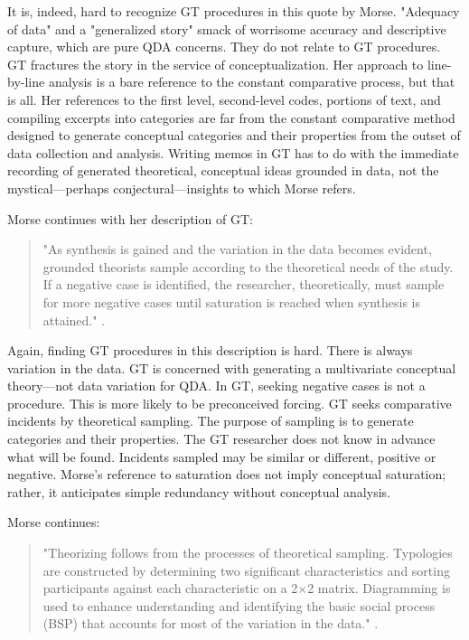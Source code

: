 It is, indeed, hard to recognize GT procedures in this quote by Morse.
"Adequacy of data" and a "generalized story" smack of worrisome accuracy and descriptive capture, 
which are pure QDA concerns. 
They do not relate to GT procedures. 
GT fractures the story in the service of conceptualization. 
Her approach to line-by-line analysis is a bare reference to the constant comparative process, but that is all. 
Her references to the first level, second-level codes, portions of text, and compiling excerpts into categories are far from the constant comparative method designed to generate conceptual categories and their properties from the outset of data collection and analysis.
Writing memos in GT has to do with the immediate recording of generated theoretical, conceptual ideas grounded in data, not the mystical—perhaps conjectural—insights to which Morse refers.

Morse continues with her description of GT:
\begin{quote}
"As synthesis is gained and the variation in the data becomes evident,
grounded theorists sample according to the theoretical needs of the
study. 
If a negative case is identified, the researcher, theoretically, must
sample for more negative cases until saturation is reached when
synthesis is attained."
\citep[p. 39]{incollection.morse94}.
\end{quote}

Again, finding GT procedures in this description is hard. 
There is always variation in the data. 
GT is concerned with generating a multivariate conceptual theory—not data variation for QDA.
In GT, seeking negative cases is not a procedure. 
This is more likely to be preconceived forcing. 
GT seeks comparative incidents by theoretical sampling. 
The purpose of sampling is to generate categories and their properties. The GT researcher does not know in advance what will be found. 
Incidents sampled may be similar or different, positive or negative.
Morse’s reference to saturation does not imply conceptual saturation; rather, it anticipates simple redundancy without conceptual analysis.

Morse continues:

\begin{quote}
"Theorizing follows from the processes of theoretical sampling.
Typologies are constructed by determining two significant characteristics and sorting participants against each characteristic on a 2×2 matrix.
Diagramming is used to enhance understanding and identifying the
basic social process (BSP) that accounts for most of the variation in the
data."
\citep[p. 39]{incollection.morse94}.
\end{quote}

